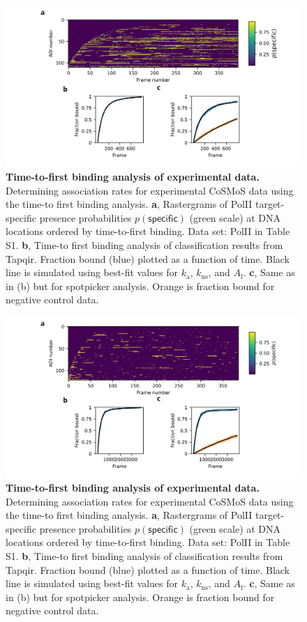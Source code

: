 \begin{figure}[t]
\centering
\includegraphics[width=\textwidth]{extended-data/figure3/figure3.png}
\caption{\textbf{Time-to-first binding analysis of experimental data.}  Determining association rates for experimental CoSMoS data using the time-to first binding analysis. \textbf{a}, Rastergrams of PolII target-specific presence probabilities $p(\mathsf{specific})$ (green scale) at DNA locations ordered by time-to-first binding. Data set: PolII in Table S1. \textbf{b}, Time-to first binding analysis of classification results from Tapqir. Fraction bound (blue) plotted as a function of time. Black line is simulated using best-fit values for $k_\mathrm{a}$, $k_\mathrm{ns}$, and $A_\mathrm{f}$. \textbf{c}, Same as in (b) but for spotpicker analysis. Orange is fraction bound for negative control data.
}
\label{fig:experimental_data}
\end{figure}

\begin{figure}[t]
\centering
\includegraphics[width=\textwidth]{extended-data/figure4/figure4.png}
\caption{\textbf{Time-to-first binding analysis of experimental data.}  Determining association rates for experimental CoSMoS data using the time-to first binding analysis. \textbf{a}, Rastergrams of PolII target-specific presence probabilities $p(\mathsf{specific})$ (green scale) at DNA locations ordered by time-to-first binding. Data set: PolII in Table S1. \textbf{b}, Time-to first binding analysis of classification results from Tapqir. Fraction bound (blue) plotted as a function of time. Black line is simulated using best-fit values for $k_\mathrm{a}$, $k_\mathrm{ns}$, and $A_\mathrm{f}$. \textbf{c}, Same as in (b) but for spotpicker analysis. Orange is fraction bound for negative control data.
}
\label{fig:experimental_data}
\end{figure}

